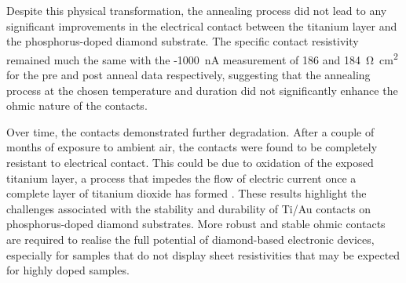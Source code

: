 \begin{refsection}
Despite this physical transformation, the annealing process did not lead to any significant improvements in the electrical contact between the titanium layer and the phosphorus-doped diamond substrate. The specific contact resistivity remained much the same with the -1000~\si{\nano\ampere} measurement of 186 and 184~\si{\ohm\centi\metre\squared} for the pre and post anneal data respectively, suggesting that the annealing process at the chosen temperature and duration did not significantly enhance the ohmic nature of the contacts.

Over time, the contacts demonstrated further degradation. After a couple of months of exposure to ambient air, the contacts were found to be completely resistant to electrical contact. This could be due to oxidation of the exposed titanium layer, a process that impedes the flow of electric current once a complete layer of titanium dioxide has formed \cite{Das2022}. These results highlight the challenges associated with the stability and durability of Ti/Au contacts on phosphorus-doped diamond substrates. More robust and stable ohmic contacts are required to realise the full potential of diamond-based electronic devices, especially for samples that do not display sheet resistivities that may be expected for highly doped samples.


\end{refsection}
